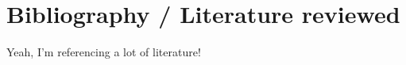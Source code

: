 \chapter{Bibliography / Literature reviewed}
Yeah, I'm referencing a lot of literature!
\cite{schuld_evaluating_2019,mitarai_quantum_2018,wendenius_gradient-free_2023}
\printbibliography
